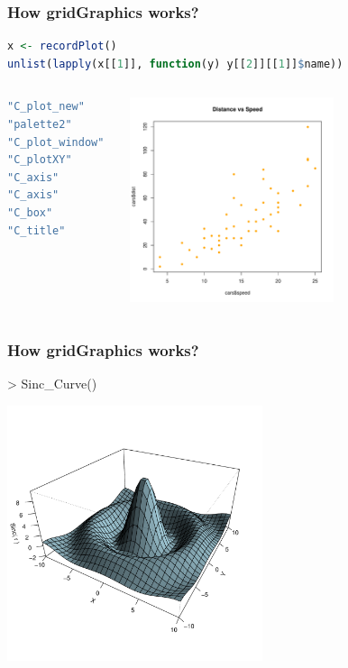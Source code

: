 \documentclass{beamer}
\begin{document}
\begin{frame}[fragile]
\frametitle{How \textbf{gridGraphics} works?}


\begin{lstlisting}[language = R]
x <- recordPlot()
unlist(lapply(x[[1]], function(y) y[[2]][[1]]$name))
\end{lstlisting}

\begin{columns}[c]
\begin{lstlisting}[language = R]
"C_plot_new"    
"palette2"      
"C_plot_window" 
"C_plotXY"      
"C_axis"        
"C_axis"       
"C_box"         
"C_title"    
\end{lstlisting}


\includegraphics[height = 6cm, width = 6cm]{plot/intro_1.pdf}

\end{columns}

\end{frame}



\begin{frame}[fragile]
\frametitle{How \textbf{gridGraphics} works?}
\begin{Schunk}
\begin{Sinput}
> Sinc_Curve()
\end{Sinput}
\end{Schunk}
\begin{center}
  \includegraphics[height = 7.5cm, width = 7.5cm]{plot/persp_1}
\end{center}



\end{frame}
\end{document}
